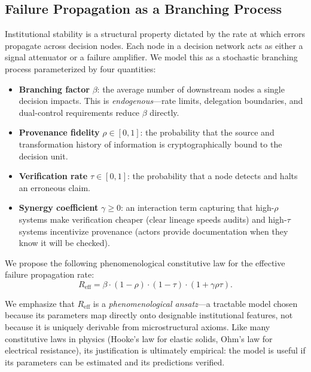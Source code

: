 \documentclass[runningheads]{llncs}
\begin{document}
\subsection{Failure Propagation as a Branching Process}

Institutional stability is a structural property dictated by the rate at which errors propagate across decision nodes. Each node in a decision network acts as either a signal attenuator or a failure amplifier. We model this as a stochastic branching process parameterized by four quantities:

\begin{itemize}
\item \textbf{Branching factor} $\beta$: the average number of downstream nodes a single decision impacts. This is \emph{endogenous}---rate limits, delegation boundaries, and dual-control requirements reduce $\beta$ directly.
\item \textbf{Provenance fidelity} $\rho \in [0,1]$: the probability that the source and transformation history of information is cryptographically bound to the decision unit.
\item \textbf{Verification rate} $\tau \in [0,1]$: the probability that a node detects and halts an erroneous claim.
\item \textbf{Synergy coefficient} $\gamma \geq 0$: an interaction term capturing that high-$\rho$ systems make verification cheaper (clear lineage speeds audits) and high-$\tau$ systems incentivize provenance (actors provide documentation when they know it will be checked).
\end{itemize}

We propose the following phenomenological constitutive law for the effective failure propagation rate:
\begin{equation}
R_{\mathrm{eff}} = \beta \cdot (1-\rho) \cdot (1-\tau) \cdot (1+\gamma \rho \tau).
\label{eq:reff}
\end{equation}

We emphasize that $R_{\mathrm{eff}}$ is a \emph{phenomenological ansatz}---a tractable model chosen because its parameters map directly onto designable institutional features, not because it is uniquely derivable from microstructural axioms. Like many constitutive laws in physics (Hooke's law for elastic solids, Ohm's law for electrical resistance), its justification is ultimately empirical: the model is useful if its parameters can be estimated and its predictions verified.
\end{document}
